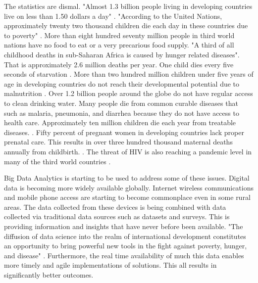 \documentclass[sigconf]{acmart}
\begin{document}
The statistics are dismal. "Almost 1.3 billion people living in developing countries live on less than 1.50 dollars a day" \cite{www-google-top5}.  "According to the United Nations, approximately twenty two thousand children die each day in these countries due to poverty" \cite{www-google-top10}.   More than eight hundred seventy million people in third world nations have no food to eat or a very precarious food supply. "A third of all childhood deaths in sub-Saharan Africa is caused by hunger related diseases"\cite{www-google-top10}. That is approximately 2.6 million deaths per year. One child dies every five seconds of starvation \cite{www-google-top10}. More than two hundred million children under five years of age in developing countries do not reach their developmental potential due to malnutrition \cite{www-google-WikiDevC}.  Over 1.2 billion people around the globe do not have regular access to clean drinking water. Many people die from common curable diseases that such as malaria, pneumonia, and diarrhea because they do not have access to health care. Approximately ten million children die each year from treatable diseases. \cite{www-google-top5}.  Fifty percent of pregnant women in developing countries lack proper prenatal care. This results in over three hundred thousand maternal deaths annually from childbirth.  \cite{www-google-top10}. The threat of HIV is also reaching a pandemic level in many of the third world countries \cite{www-google-top10}.

Big Data Analytics is starting to be used to address some of these issues. Digital data is becoming more widely available globally. Internet wireless communications and mobile phone access are starting to become commonplace even in some rural areas. The data collected from these devices is being combined with data collected via traditional data sources such as datasets and surveys. This is providing information and insights that have never before been available. "The diffusion of data science into the realm of international development constitutes an opportunity to bring powerful new tools in the fight against poverty, hunger, and disease" \cite{www-google-GloPls}. Furthermore, the real time availability of much this data enables more timely and agile implementations of solutions. This all results in significantly better outcomes.
\end{document}
